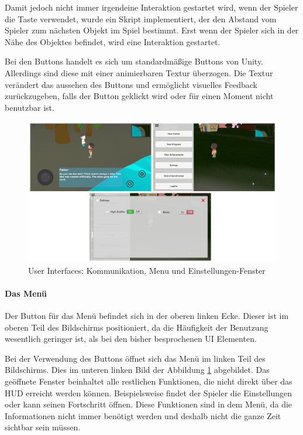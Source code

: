 				Damit jedoch nicht immer irgendeine Interaktion gestartet wird, wenn der Spieler die Taste verwendet, wurde ein Skript implementiert, der den Abstand vom Spieler zum nächsten Objekt im Spiel bestimmt. Erst wenn der Spieler sich in der Nähe des Objektes befindet, wird eine Interaktion gestartet.
				
				Bei den Buttons handelt es sich um standardmäßige Buttons von Unity. Allerdings sind diese mit einer animierbaren Textur überzogen. Die Textur verändert das aussehen des Buttons und ermöglicht visuelles Feedback zurückzugeben, falls der Button geklickt wird oder für einen Moment nicht benutzbar ist.
				
				\begin{figure}[htbp]
					\centering 
					\label{userInterfaces}
					\includegraphics[width=\textwidth]{pics/userInterface.png}
					\caption{User Interfaces: Kommunikation, Menu und Einstellungen-Fenster}
				\end{figure}
			
			\paragraph{Das Menü}
				Der Button für das Menü befindet sich in der oberen linken Ecke. Dieser ist im oberen Teil des Bildschirms positioniert, da die Häufigkeit der Benutzung wesentlich geringer ist, als bei den bisher besprochenen UI Elementen.
				
				Bei der Verwendung des Buttons öffnet sich das Menü im linken Teil des Bildschirms. Dies im unteren linken Bild der Abbildung \ref{userInterfaces} abgebildet. Das geöffnete Fenster beinhaltet alle restlichen Funktionen, die nicht direkt über das HUD erreicht werden können. Beispielsweise findet der Spieler die Einstellungen oder kann seinen Fortschritt öffnen. Diese Funktionen sind in dem Menü, da die Informationen nicht immer benötigt werden und deshalb nicht die ganze Zeit sichtbar sein müssen. 
				

